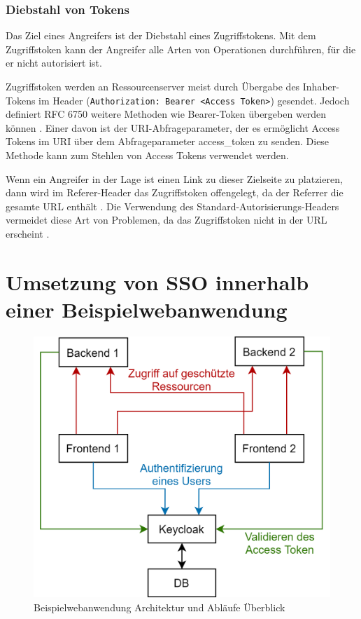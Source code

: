 \subsubsection{Diebstahl von Tokens}

Das Ziel eines Angreifers ist der Diebstahl eines Zugriffstokens. Mit dem Zugriffstoken kann der Angreifer alle Arten von Operationen durchführen, für die er nicht autorisiert ist. 

Zugriffstoken werden an Ressourcenserver meist durch Übergabe des Inhaber-Tokens im Header (\texttt{Authorization: Bearer <Access Token>}) gesendet. Jedoch definiert RFC 6750 weitere Methoden wie Bearer-Token übergeben werden können \cite{RFC6750}. Einer davon ist der URI-Abfrageparameter, der es ermöglicht Access Tokens im URI über dem Abfrageparameter access\_token zu senden. Diese Methode kann zum Stehlen von Access Tokens verwendet werden. 


Wenn ein Angreifer in der Lage ist einen Link zu dieser Zielseite zu platzieren, dann wird im Referer-Header das Zugriffstoken offengelegt, da der Referrer die gesamte URL enthält  \cite{OAuth2inAction}. Die Verwendung des Standard-Autorisierungs-Headers vermeidet diese Art von Problemen, da das Zugriffstoken nicht in der URL erscheint \cite{OAuth2inAction}.






\section{Umsetzung von SSO innerhalb einer Beispielwebanwendung}


\begin{figure}[!ht]
	\centering
	\includegraphics[width=.8\textwidth]{Images/Ebert/ArchitectureDiagram.png}
	\caption{Beispielwebanwendung Architektur und Abläufe Überblick}
	\label{fig:EB_Beispielwebanwendung Architektur und Abläufe Überblick}
\end{figure}

